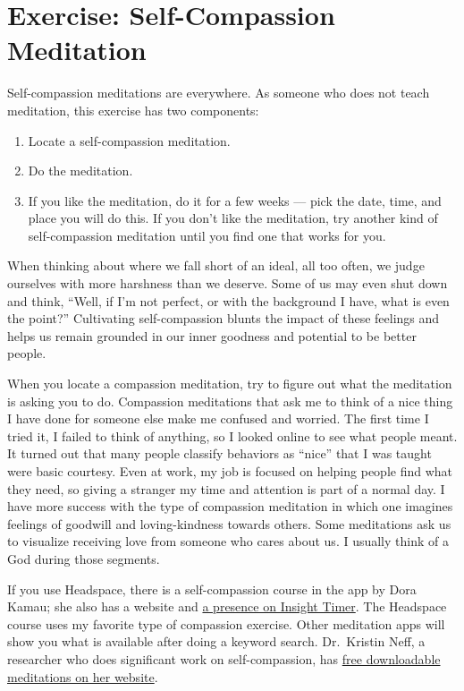 \documentclass[
]{book}
\providecommand{\tightlist}{%
  \setlength{\itemsep}{0pt}\setlength{\parskip}{0pt}}
\begin{document}
\hypertarget{exercise-self-compassion-meditation}{%
\section{Exercise: Self-Compassion Meditation}\label{exercise-self-compassion-meditation}}

Self-compassion meditations are everywhere. As someone who does not teach meditation, this exercise has two components:

\begin{enumerate}
\def\labelenumi{\arabic{enumi}.}
\tightlist
\item
  Locate a self-compassion meditation.
\item
  Do the meditation.
\item
  If you like the meditation, do it for a few weeks --- pick the date, time, and place you will do this. If you don't like the meditation, try another kind of self-compassion meditation until you find one that works for you.
\end{enumerate}

When thinking about where we fall short of an ideal, all too often, we judge ourselves with more harshness than we deserve. Some of us may even shut down and think, ``Well, if I'm not perfect, or with the background I have, what is even the point?'' Cultivating self-compassion blunts the impact of these feelings and helps us remain grounded in our inner goodness and potential to be better people.

When you locate a compassion meditation, try to figure out what the meditation is asking you to do. Compassion meditations that ask me to think of a nice thing I have done for someone else make me confused and worried. The first time I tried it, I failed to think of anything, so I looked online to see what people meant. It turned out that many people classify behaviors as ``nice'' that I was taught were basic courtesy. Even at work, my job is focused on helping people find what they need, so giving a stranger my time and attention is part of a normal day. I have more success with the type of compassion meditation in which one imagines feelings of goodwill and loving-kindness towards others. Some meditations ask us to visualize receiving love from someone who cares about us. I usually think of a God during those segments.

If you use Headspace, there is a self-compassion course in the app by Dora Kamau; she also has a website and \href{https://insighttimer.com/dorakamau}{a presence on Insight Timer}. The Headspace course uses my favorite type of compassion exercise. Other meditation apps will show you what is available after doing a keyword search. Dr.~Kristin Neff, a researcher who does significant work on self-compassion, has \href{https://self-compassion.org/guided-self-compassion-meditations-mp3-2/}{free downloadable meditations on her website}.
\end{document}
